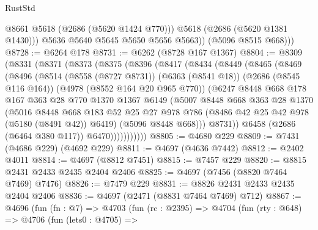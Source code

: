 \begin{lexlean}{RustStd}
\begin{coremodule}
                @8661
                @5618
                (@2686 (@5620 @1424 @770)))
              @5618
              (@2686 (@5620 @1381 @1430)))
            @5636
            @5640
            @5645
            @5650
            @5656
            @5663))
        (@5096 @8515 @668)))
@8728 := @6264 @178
@8731 := @6262 (@8728 @167 @1367)
@8804 := @8309
    (@8331
      (@8371
        (@8373
          (@8375
            (@8396
              (@8417
                (@8434
                  (@8449
                    (@8465
                      (@8469
                        (@8496
                          (@8514
                            (@8558 (@8727 @8731))
                            (@6363 (@8541 @18))
                            (@2686 (@8545 @116 @164))
                            (@4978 (@8552 @164 @20 @965 @770))
                            (@6247
                              @8448
                              @668
                              @178
                              @167
                              @363
                              @28
                              @770
                              @1370
                              @1367
                              @6149
                              (@5007
                                @8448
                                @668
                                @363
                                @28
                                @1370
                                (@5016
                                  @8448
                                  @668
                                  @183
                                  @52
                                  @25
                                  @27
                                  @978
                                  @786
                                  (@8486 @42 @25 @42 @978 (@5180 (@8491 @42)) @6419)
                                  (@5096 @8448 @668)))
                              @8731))
                          @6458
                          (@2686 (@6464 @380 @117))
                          @6470)))))))))))
@8805 := @4680 @229
@8809 := @7431 (@4686 @229) (@4692 @229)
@8811 := @4697 (@4636 @7442)
@8812 := @2402 @4011
@8814 := @4697 (@8812 @7451)
@8815 := @7457 @229
@8820 := @8815 @2431 @2433 @2435 @2404 @2406
@8825 := @4697 (@7456 (@8820 @7464 @7469) @7476)
@8826 := @7479 @229
@8831 := @8826 @2431 @2433 @2435 @2404 @2406
@8836 := @4697 (@2471 (@8831 @7464 @7469) @712)
@8867 := @4696
    (fun (fn : @7) =>
    @4703
      (fun (rc : @2395) =>
      @4704
        (fun (rty : @648) =>
        @4706
          (fun (lets0 : @4705) =>

\end{coremodule}
\end{lexlean}
